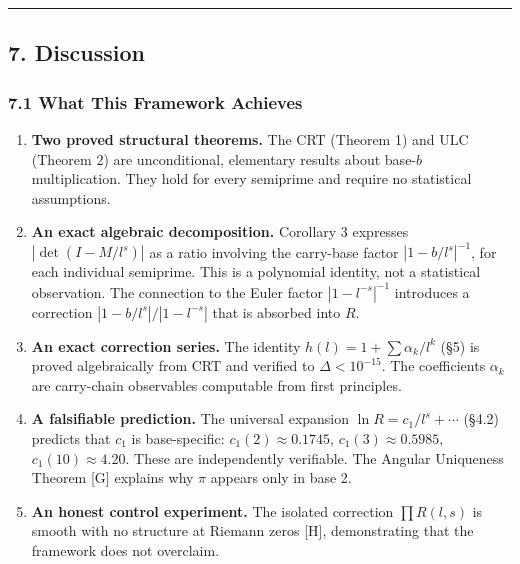 \documentclass[
  11pt,
]{article}
\providecommand{\tightlist}{%
  \setlength{\itemsep}{0pt}\setlength{\parskip}{0pt}}
\begin{document}
\begin{center}\rule{0.5\linewidth}{0.5pt}\end{center}

\newpage

\subsection{7. Discussion}\label{discussion}

\subsubsection{7.1 What This Framework
Achieves}\label{what-this-framework-achieves}

\begin{enumerate}
\def\labelenumi{\arabic{enumi}.}
\tightlist
\item
  \textbf{Two proved structural theorems.} The CRT (Theorem 1) and ULC (Theorem
  2) are unconditional, elementary results about base-\(b\) multiplication. They
  hold for every semiprime and require no statistical assumptions.
\item
  \textbf{An exact algebraic decomposition.} Corollary 3 expresses
  \(|\det(I - M/l^s)|\) as a ratio involving the carry-base factor
  \(|1 - b/l^s|^{-1}\), for each individual semiprime. This is a polynomial
  identity, not a statistical observation. The connection to the Euler factor
  \(|1 - l^{-s}|^{-1}\) introduces a correction \(|1 - b/l^s|/|1 - l^{-s}|\)
  that is absorbed into \(R\).
\item
  \textbf{An exact correction series.} The identity
  \(h(l) = 1 + \sum \alpha_k / l^k\) (§5) is proved algebraically from CRT and
  verified to \(\Delta < 10^{-15}\). The coefficients \(\alpha_k\) are
  carry-chain observables computable from first principles.
\item
  \textbf{A falsifiable prediction.} The universal expansion
  \(\ln R = c_1/l^s + \cdots\) (§4.2) predicts that \(c_1\) is base-specific:
  \(c_1(2) \approx 0.1745\), \(c_1(3) \approx 0.5985\),
  \(c_1(10) \approx 4.20\). These are independently verifiable. The Angular
  Uniqueness Theorem {[}G{]} explains why \(\pi\) appears only in base 2.
\item
  \textbf{An honest control experiment.} The isolated correction
  \(\prod R(l,s)\) is smooth with no structure at Riemann zeros {[}H{]},
  demonstrating that the framework does not overclaim.
\end{enumerate}
\end{document}
